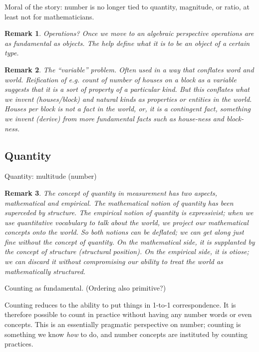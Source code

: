 \documentclass[11pt,twoside]{article}
\newtheorem{remark}{Remark}
\begin{document}
Moral of the story: number is no longer tied to quantity, magnitude, or ratio, at least not for mathematicians.

\begin{remark}
  Operations?  Once we move to an algebraic perspective operations are
  as fundamental as objects.  The help define what it is to be an
  object of a certain type.
\end{remark}

\begin{remark}
  The ``variable'' problem.  Often used in a way that conflates word
  and world.  Reification of e.g. count of number of houses on a block
  as a variable suggests that it is a sort of property of a particular
  kind.  But this conflates what we invent (houses/block) and natural
  kinds as properties or entities in the world.  Houses per block is
  not a fact in the world, or, it is a contingent fact, something we
  invent (derive) from more fundamental facts such as house-ness and
  block-ness.
\end{remark}

\subsection{Quantity}

Quantity:  multitude (number)

\begin{remark}
  The concept of quantity in measurement has two aspects, mathematical
  and empirical.  The mathematical notion of quantity has been
  superceded by structure.  The empirical notion of quantity is
  expressivist; when we use quantitative vocabulary to talk about the
  world, we project our mathematical concepts onto the world.  So both
  notions can be deflated; we can get along just fine without the
  concept of quantity.  On the mathematical side, it is supplanted by
  the concept of structure (structural position).  On the empirical
  side, it is otiose; we can discard it without compromising our
  ability to treat the world as mathematically structured.
\end{remark}

Counting as fundamental.  (Ordering also primitive?)

Counting reduces to the ability to put things in 1-to-1
correspondence.  It is therefore possible to count in practice without
having any number words or even concepts.  This is an essentially
pragmatic perspective on number; counting is something we know
\textit{how} to do, and number concepts are instituted by counting
practices.
\end{document}
